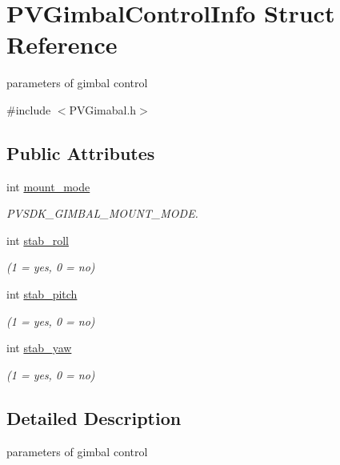 \hypertarget{struct_p_v_gimbal_control_info}{}\section{P\+V\+Gimbal\+Control\+Info Struct Reference}
\label{struct_p_v_gimbal_control_info}


parameters of gimbal control  




{\ttfamily \#include $<$P\+V\+Gimabal.\+h$>$}

\subsection*{Public Attributes}
\begin{DoxyCompactItemize}
\item 
int \hyperlink{struct_p_v_gimbal_control_info_a7ebe15fe4ac099e91cbd7c897d6db736}{mount\+\_\+mode}
\begin{DoxyCompactList}\small\item\em P\+V\+S\+D\+K\+\_\+\+G\+I\+M\+B\+A\+L\+\_\+\+M\+O\+U\+N\+T\+\_\+\+M\+O\+DE. \end{DoxyCompactList}\item 
int \hyperlink{struct_p_v_gimbal_control_info_a6c296bd2af3812ac0d6243e0aa7820e9}{stab\+\_\+roll}
\begin{DoxyCompactList}\small\item\em (1 = yes, 0 = no) \end{DoxyCompactList}\item 
int \hyperlink{struct_p_v_gimbal_control_info_a8040d73b2f6316a61da79a287b3b8834}{stab\+\_\+pitch}
\begin{DoxyCompactList}\small\item\em (1 = yes, 0 = no) \end{DoxyCompactList}\item 
int \hyperlink{struct_p_v_gimbal_control_info_a3f1d390dce1cae47c2d82af9a7134421}{stab\+\_\+yaw}
\begin{DoxyCompactList}\small\item\em (1 = yes, 0 = no) \end{DoxyCompactList}\end{DoxyCompactItemize}


\subsection{Detailed Description}
parameters of gimbal control 

